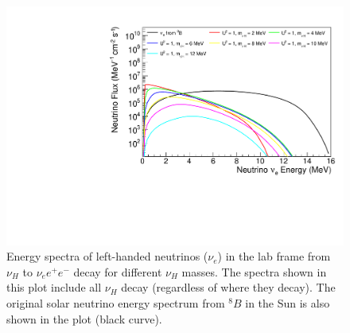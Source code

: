 \documentclass[%
 reprint,
 amsmath,amssymb,
 aps,
 prd,
floatfix,
twocolumn,
]{revtex4-1}
\begin{document}
\begin{figure}[!htbp]
\includegraphics[width=0.99\columnwidth]{../plots/nuLSpectrum_U1.0_AllMass_linXlogY.pdf}
\caption{Energy spectra of left-handed neutrinos ($\nu_e$) in the lab frame from $\nu_H$ to $\nu_e e^+ e^-$ decay for different $\nu_H$ masses. The spectra shown in this plot include all $\nu_H$ decay (regardless of where they decay). The original solar neutrino energy spectrum from  $^8B$ in the Sun is also shown in the plot (black curve). }
\label{fig:nuLSpectrum_all_decay} 
\end{figure}
\end{document}
